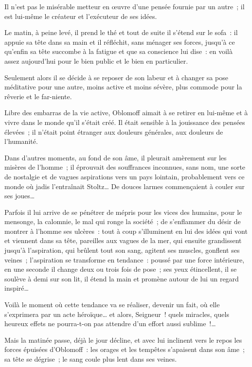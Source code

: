 \documentclass[french,twoside]{book} %
\begin{document}
Il n’est pas le misérable metteur en œuvre d’une pensée fournie par un autre ; il est lui-même le créateur et l’exécuteur de ses idées.\par
Le matin, à peine levé, il prend le thé et tout de suite il s’étend sur le sofa : il appuie sa tête dans sa main et il réfléchit, sans ménager ses forces, jusqu’à ce qu’enfin sa tête succombe à la fatigue et que sa conscience lui dise : en voilà assez aujourd’hui pour le bien public et le bien en particulier.\par
Seulement alors il se décide à se reposer de son labeur et à changer sa pose méditative pour une autre, moins active et moins sévère, plus commode pour la rêverie et le far-niente.\par
Libre des embarras de la vie active, Oblomoff aimait à se retirer en lui-même et à vivre dans le monde qu’il s’était créé. Il était sensible à la jouissance des pensées élevées ; il n’était point étranger aux douleurs générales, aux douleurs de l’humanité.\par
Dans d’autres moments, au fond de son âme, il pleurait amèrement sur les misères de l’homme ; il éprouvait des souffrances inconnues, sans nom, une sorte de nostalgie et de vagues aspirations vers un pays lointain, probablement vers ce monde où jadis l’entraînait Stoltz… De douces larmes commençaient à couler sur ses joues…\par
Parfois il lui arrive de se pénétrer de mépris pour les vices des humains, pour le mensonge, la calomnie, le mal qui ronge la société ; de s’enflammer du désir de montrer à l’homme ses ulcères : tout à coup s’illuminent en lui des idées qui vont et viennent dans sa tête, pareilles aux vagues de la mer, qui ensuite grandissent jusqu’à l’aspiration, qui brûlent tout son sang, agitent ses muscles, gonflent ses veines ; l’aspiration se transforme en tendance : poussé par une force intérieure, en une seconde il change deux ou trois fois de pose ; ses yeux étincellent, il se soulève à demi sur son lit, il étend la main et promène autour de lui un regard inspiré…\par
Voilà le moment où cette tendance va se réaliser, devenir un fait, où elle s’exprimera par un acte héroïque… et alors, Seigneur ! quels miracles, quels heureux effets ne pourra-t-on pas attendre d’un effort aussi sublime !…\par
Mais la matinée passe, déjà le jour décline, et avec lui inclinent vers le repos les forces épuisées d’Oblomoff : les orages et les tempêtes s’apaisent dans son âme ; sa tête se dégrise ; le sang coule plus lent dans ses veines.\par
\end{document}
